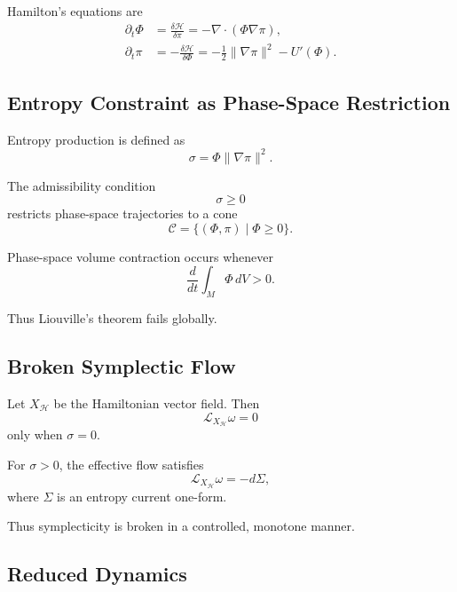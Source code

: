 \documentclass[11pt]{article}
\begin{document}
Hamilton’s equations are
\begin{align}
\partial_t \Phi &= \frac{\delta \mathcal{H}}{\delta \pi}
= -\nabla\cdot(\Phi\nabla\pi), \\
\partial_t \pi &= -\frac{\delta \mathcal{H}}{\delta \Phi}
= -\frac{1}{2}\lVert\nabla\pi\rVert^2 - U'(\Phi).
\end{align}

\subsection*{Entropy Constraint as Phase-Space Restriction}

Entropy production is defined as
\begin{equation}
\sigma = \Phi \lVert \nabla \pi \rVert^2.
\end{equation}

The admissibility condition
\begin{equation}
\sigma \ge 0
\end{equation}
restricts phase-space trajectories to a cone
\begin{equation}
\mathcal{C} = \{ (\Phi,\pi) \mid \Phi \ge 0 \}.
\end{equation}

Phase-space volume contraction occurs whenever
\begin{equation}
\frac{d}{dt} \int_M \Phi \, dV > 0.
\end{equation}

Thus Liouville’s theorem fails globally.

\subsection*{Broken Symplectic Flow}

Let $X_\mathcal{H}$ be the Hamiltonian vector field.
Then
\begin{equation}
\mathcal{L}_{X_\mathcal{H}} \omega = 0
\end{equation}
only when $\sigma = 0$.

For $\sigma > 0$, the effective flow satisfies
\begin{equation}
\mathcal{L}_{X_\mathcal{H}} \omega = - d\Sigma,
\end{equation}
where $\Sigma$ is an entropy current one-form.

Thus symplecticity is broken in a controlled, monotone manner.

\subsection*{Reduced Dynamics}
\end{document}
